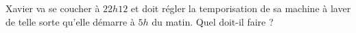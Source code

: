 
\begin{exercice}\label{exo2smath-0242}

    Xavier va se coucher à \( 22h12\) et doit régler la temporisation de sa machine à laver de telle sorte qu'elle démarre à \( 5h\) du matin. Quel doit-il faire ?

\end{exercice}
